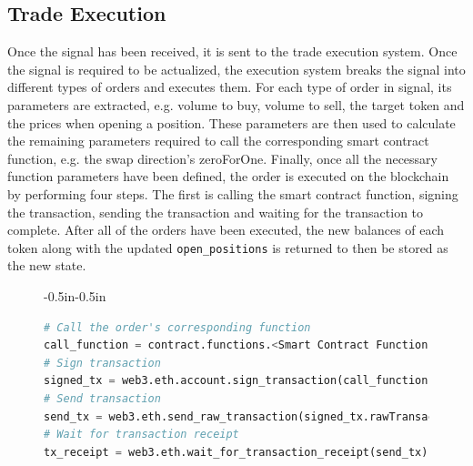 \subsection{Trade Execution}
Once the signal has been received, it is sent to the trade execution system. Once the signal is required to be actualized, the execution system breaks the signal into different types of orders and executes them. For each type of order in signal, its parameters are extracted, e.g. volume to buy, volume to sell, the target token and the prices when opening a position. These parameters are then used to calculate the remaining parameters required to call the corresponding smart contract function, e.g. the swap direction's zeroForOne. Finally, once all the necessary function parameters have been defined, the order is executed on the blockchain by performing four steps. The first is calling the smart contract function, signing the transaction, sending the transaction and waiting for the transaction to complete. After all of the orders have been executed, the new balances of each token along with the updated \texttt{open\_positions} is returned to then be stored as the new state.
\begin{figure}[htb!]
\begin{adjustwidth}{-0.5in}{-0.5in}
\begin{minipage}{\linewidth}
\centering
\begin{lstlisting}[language=Python]
# Call the order's corresponding function
call_function = contract.functions.<Smart Contract Function Name>(<Function Paramters>).buildTransaction({"chainId": Chain_id, "from": caller, "nonce": nonce})
# Sign transaction
signed_tx = web3.eth.account.sign_transaction(call_function, private_key=private_key)
# Send transaction
send_tx = web3.eth.send_raw_transaction(signed_tx.rawTransaction)
# Wait for transaction receipt
tx_receipt = web3.eth.wait_for_transaction_receipt(send_tx)
\end{lstlisting}
\end{minipage}
\end{adjustwidth}
\end{figure}
